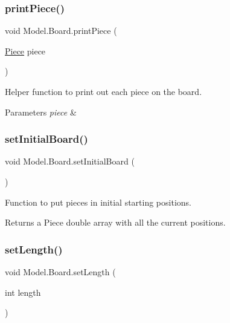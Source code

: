 \subsubsection{\texorpdfstring{print\+Piece()}{printPiece()}}
{\footnotesize\ttfamily void Model.\+Board.\+print\+Piece (\begin{DoxyParamCaption}\item[{\hyperlink{class_model_1_1_pieces_1_1_piece}{Piece}}]{piece }\end{DoxyParamCaption})}

Helper function to print out each piece on the board. 
\begin{DoxyParams}{Parameters}
{\em piece} & \\
\hline
\end{DoxyParams}
\hypertarget{class_model_1_1_board_aae76066ac44573318ad06038bcd1cf8e}{}\label{class_model_1_1_board_aae76066ac44573318ad06038bcd1cf8e} 
\subsubsection{\texorpdfstring{set\+Initial\+Board()}{setInitialBoard()}}
{\footnotesize\ttfamily void Model.\+Board.\+set\+Initial\+Board (\begin{DoxyParamCaption}{ }\end{DoxyParamCaption})}

Function to put pieces in initial starting positions. \begin{DoxyReturn}{Returns}
a Piece double array with all the current positions. 
\end{DoxyReturn}
\hypertarget{class_model_1_1_board_a189aa2f23e52d961f2cb7f39f584e0a6}{}\label{class_model_1_1_board_a189aa2f23e52d961f2cb7f39f584e0a6} 
\subsubsection{\texorpdfstring{set\+Length()}{setLength()}}
{\footnotesize\ttfamily void Model.\+Board.\+set\+Length (\begin{DoxyParamCaption}\item[{int}]{length }\end{DoxyParamCaption})}

